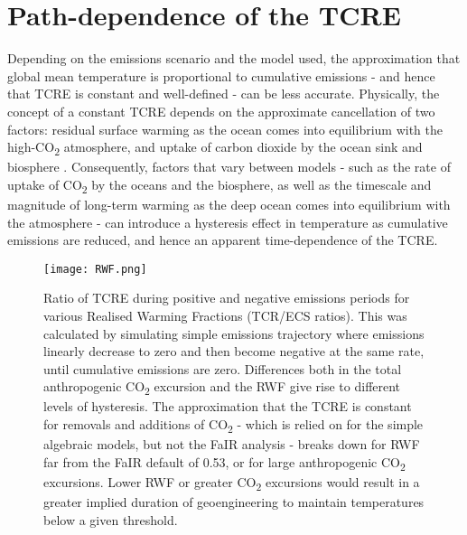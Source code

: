 \documentclass[draft]{agujournal2019}
\begin{document}
\newpage


\section{Path-dependence of the TCRE}












Depending on the emissions scenario and the model used, the approximation that global mean temperature is proportional to cumulative emissions - and hence that TCRE is constant and well-defined - can be less accurate. Physically, the concept of a constant TCRE depends on the approximate cancellation of two factors: residual surface warming as the ocean comes into equilibrium with the high-CO\textsubscript{2} atmosphere, and uptake of carbon dioxide by the ocean sink and biosphere \cite{allen2009warming}. Consequently, factors that vary between models - such as the rate of uptake of CO\textsubscript{2} by the oceans and the biosphere, as well as the timescale and magnitude of long-term warming as the deep ocean comes into equilibrium with the atmosphere - can introduce a hysteresis effect in temperature as cumulative emissions are reduced, and hence an apparent time-dependence of the TCRE. 

\begin{figure}[!h]
  \texttt{[image: RWF.png]}
  \caption{Ratio of TCRE during positive and negative emissions periods for various Realised Warming Fractions (TCR/ECS ratios). This was calculated by simulating simple emissions trajectory where emissions linearly decrease to zero and then become negative at the same rate, until cumulative emissions are zero. Differences both in the total anthropogenic CO\textsubscript{2} excursion and the RWF give rise to different levels of hysteresis. The approximation that the TCRE is constant for removals and additions of CO\textsubscript{2} - which is relied on for the simple algebraic models, but not the FaIR analysis - breaks down for RWF far from the FaIR default of 0.53, or for large anthropogenic CO\textsubscript{2} excursions. Lower RWF or greater CO\textsubscript{2} excursions would result in a greater implied duration of geoengineering to maintain temperatures below a given threshold.}
  \label{fig:TCRE_RWF_hysteresis}
\end{figure}
\end{document}
